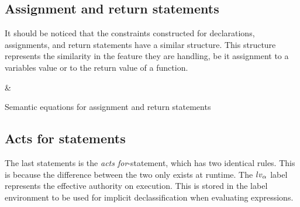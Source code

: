 \subsection{Assignment and return statements}
It should be noticed that the constraints constructed for declarations, assignments, and return statements have a similar structure.
This structure represents the similarity in the feature they are handling, be it assignment to a variables value or to the return value of a function.

\begin{table}[H]
\begin{semanticequations}
 \seSpace
& \seSpace
\end{semanticequations}
\caption{Semantic equations for assignment and return statements}
\label{cstr:assignment_return}
\end{table}

\subsection{Acts for statements}
The last statements is the \emph{acts for}-statement, which has two identical rules.
This is because the difference between the two only exists at runtime.
The $lv_\alpha$ label represents the effective authority on execution.
This is stored in the label environment to be used for implicit declassification when evaluating expressions.

